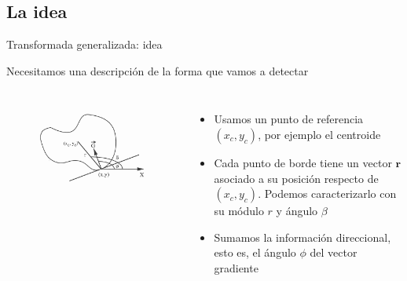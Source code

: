 \documentclass{beamer}
\begin{document}
\subsection{La idea}
\begin{frame}{Transformada generalizada: idea}

Necesitamos una descripción de la forma que vamos a detectar

\begin{columns}[c] %

    \begin{figure}
    \centering
    \includegraphics{shape_params}
    \label{fig:my_label}
\end{figure}

\begin{itemize}
    \item Usamos un punto de referencia $(x_c, y_c)$, por ejemplo el centroide
    \item Cada punto de borde tiene un vector $\textbf{r}$ asociado a su posición respecto de $(x_c, y_c)$. Podemos caracterizarlo con su módulo $r$ y ángulo $\beta$
    \item Sumamos la información direccional, esto es, el ángulo $\phi$ del vector gradiente
\end{itemize}
\end{columns}

\end{frame}
\end{document}

